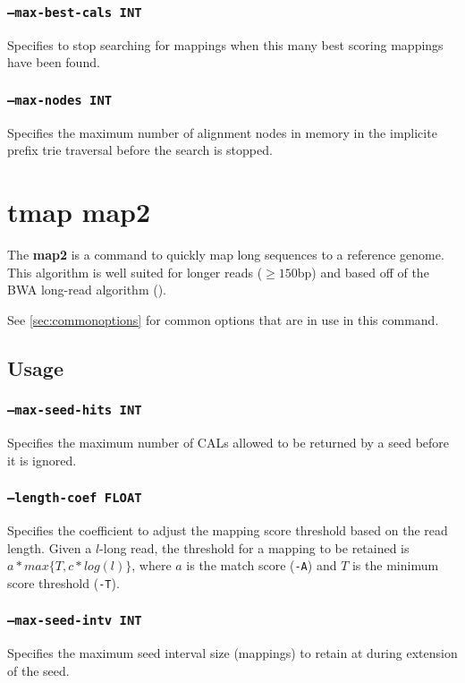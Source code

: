 \documentclass[a4paper,12pt]{book}
\newcommand{\TT}[1]{{\tt #1}} %
\newcommand{\BF}[1]{{\bf #1}} %
\begin{document}
\subsubsection{\TT{--max-best-cals INT}}
Specifies to stop searching for mappings when this many best scoring mappings have been found.

\subsubsection{\TT{--max-nodes INT}}
Specifies the maximum number of alignment nodes in memory in the implicite prefix trie traversal before the search is stopped.

\section{tmap map2}
\label{sec:map2}
The \BF{map2} is a command to quickly map long sequences to a reference genome.
This algorithm is well suited for longer reads ($\geq 150$bp) and based off of the BWA long-read algorithm (\cite{BWA-long}).

See \autoref{sec:commonoptions} for common options that are in use in this command.

\subsection{Usage}

\subsubsection{\TT{--max-seed-hits INT}}
Specifies the maximum number of CALs allowed to be returned by a seed before it is ignored.

\subsubsection{\TT{--length-coef FLOAT}}
Specifies the coefficient to adjust the mapping score threshold based on the read length.
Given a $l$-long read, the threshold for a mapping to be retained is $a*max\{T,c*log(l)\}$, where $a$ is the match score (\TT{-A}) and $T$ is the minimum score threshold (\TT{-T}).

\subsubsection{\TT{--max-seed-intv INT}}
Specifies the maximum seed interval size (mappings) to retain at during extension of the seed.
\end{document}
